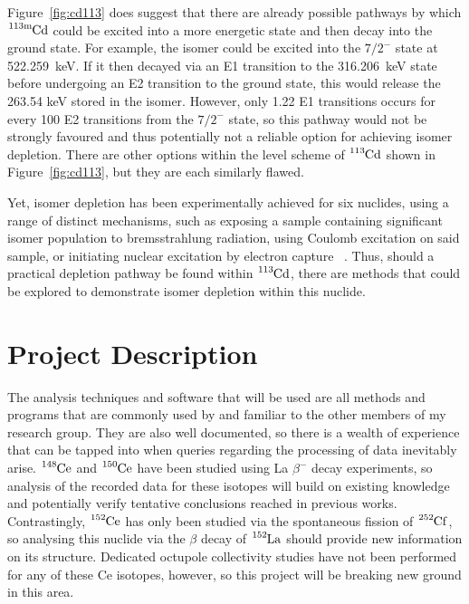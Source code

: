 \documentclass[12pt,a4paper]{article}
\newcommand{\cdm}{\ce{^{113\text{m}}Cd}}
\begin{document}
\medskip
\noindent
Figure~\ref{fig:cd113} does suggest that there are already possible pathways by which $\cdm$ could be excited into a more energetic state and then decay into the ground state.
For example, the isomer could be excited into the $7/2^-$ state at 522.259~keV.
If it then decayed via an E1 transition to the 316.206~keV state before undergoing an E2 transition to the ground state, this would release the 263.54 keV stored in the isomer.
However, only 1.22 E1 transitions occurs for every 100 E2 transitions from the $7/2^-$ state, so this pathway would not be strongly favoured and thus potentially not a reliable option for achieving isomer depletion. %
There are other options within the level scheme of $\ce{^{113}Cd}$ shown in Figure~\ref{fig:cd113}, but they are each similarly flawed.

\medskip
\noindent
Yet, isomer depletion has been experimentally achieved for six nuclides, using a range of distinct mechanisms, such as exposing a sample containing significant isomer population to bremsstrahlung radiation, using Coulomb excitation on said sample, or initiating nuclear excitation by electron capture
~\cite{shaffer_innovations_2018}.
Thus, should a practical depletion pathway be found within $\ce{^{113}Cd}$, there are methods that could be explored to demonstrate isomer depletion within this nuclide.


\section*{Project Description}
The analysis techniques and software that will be used are all methods and programs that are commonly used by and familiar to the other members of my research group.
They are also well documented, so there is a wealth of experience that can be tapped into when queries regarding the processing of data inevitably arise.
$\ce{^{148}Ce}$ and $\ce{^{150}Ce}$ have been studied using La $\beta^-$ decay experiments, so analysis of the recorded data for these isotopes will build on existing knowledge and potentially verify tentative conclusions reached in previous works.
Contrastingly, $\ce{^{152}Ce}$ has only been studied via the spontaneous fission of $\ce{^{252}Cf}$, so analysing this nuclide via the $\beta$ decay of $\ce{^{152}La}$ should provide new information on its structure.
Dedicated octupole collectivity studies have not been performed for any of these Ce isotopes, however, so this project will be breaking new ground in this area.
\end{document}
